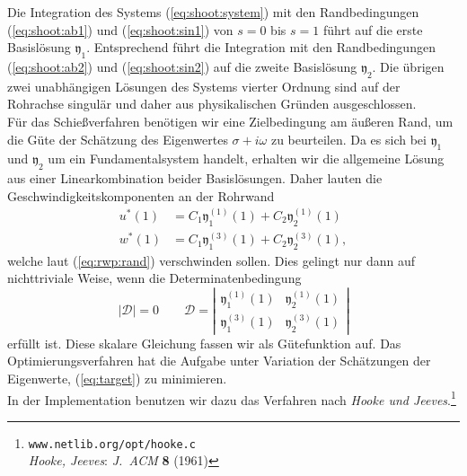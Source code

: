 \documentclass[10pt,a5paper,oneside,draft]{book}
\numberwithin{equation}{chapter}
\def\bibspace{\hspace*{18pt}}
\def\bibspace{\hspace*{21pt}}
\begin{document}
Die Integration des Systems (\mbox{\ref{eq:shoot:system}}) mit den Randbedingungen (\mbox{\ref{eq:shoot:ab1}}) und (\mbox{\ref{eq:shoot:sin1}}) von $s=0$ bis $s=1$ f\"uhrt auf die erste Basisl\"osung $\mathfrak{y}_1$.
Entsprechend f\"uhrt die Integration mit den Randbedingungen (\mbox{\ref{eq:shoot:ab2}}) und (\mbox{\ref{eq:shoot:sin2}}) auf die zweite Basisl\"osung $\mathfrak{y}_2$.
Die \"ubrigen zwei unabh\"angigen L\"osungen des Systems vierter Ordnung sind auf der Rohrachse singul\"ar und daher aus physikalischen Gr\"unden ausgeschlossen.\\

F\"ur das Schie\ss verfahren ben\"otigen wir eine Zielbedingung am \"au\ss eren Rand, um die G\"ute der Sch\"atzung des Eigenwertes $\sigma+i\omega$ zu beurteilen.
Da es sich bei $\mathfrak{y}_1$ und $\mathfrak{y}_2$ um ein Fundamentalsystem handelt, erhalten wir die allgemeine L\"osung aus einer Linearkombination beider Basisl\"osungen.
Daher lauten die Geschwindigkeitskomponenten an der Rohrwand
\begin{equation}
	\begin{split}
	u^*(1) &= C_1 \mathfrak{y}_1^{(1)}(1) + C_2 \mathfrak{y}_2^{(1)}(1) \\
	w^*(1) &= C_1 \mathfrak{y}_1^{(3)}(1) + C_2 \mathfrak{y}_2^{(3)}(1),
	\end{split}
\end{equation}
welche laut (\mbox{\ref{eq:rwp:rand}}) verschwinden sollen.
Dies gelingt nur dann auf nichttriviale Weise, wenn die Determinatenbedingung
\begin{equation}\label{eq:target}
        |\mathscr{D}| = 0\qquad \mathscr{D} = \left|
                \begin{array}{ccc}
                        \mathfrak{y}_1^{(1)}(1) & \mathfrak{y}_2^{(1)}(1) \\ 
                        \mathfrak{y}_1^{(3)}(1) & \mathfrak{y}_2^{(3)}(1)
                \end{array}
        \right|
\end{equation}
erf\"ullt ist.
Diese skalare Gleichung fassen wir als G\"utefunktion auf.
Das Optimierungsverfahren hat die Aufgabe unter Variation der Sch\"atzungen der Eigenwerte, (\mbox{\ref{eq:target}}) zu minimieren.\\
In der Implementation benutzen wir dazu das Verfahren nach \textsl{Hooke und Jeeves}.\footnote{\texttt{www.netlib.org/opt/hooke.c}\label{bib:hooke_jeeves}\\\bibspace\textsl{Hooke, Jeeves}: \textit{J.\ ACM} \textbf{8} (1961)}\\
\end{document}
